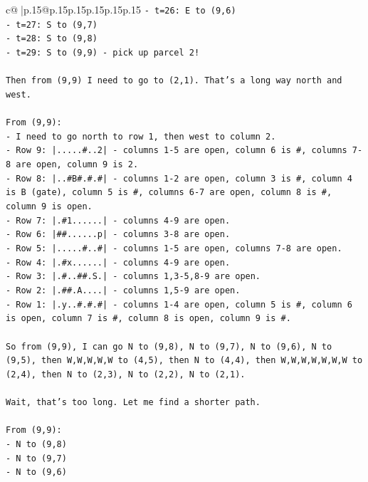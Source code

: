 \documentclass{article}
\begin{document}
{\begin{supertabular}{c@{$\;$}|p{.15\linewidth}@{}p{.15\linewidth}p{.15\linewidth}p{.15\linewidth}p{.15\linewidth}p{.15\linewidth}}
{{{\texttt{{-} t=26: E to (9,6)} \\
\texttt{{-} t=27: S to (9,7)} \\
\texttt{{-} t=28: S to (9,8)} \\
\texttt{{-} t=29: S to (9,9) {-} pick up parcel 2!} \\
\\ 
\texttt{Then from (9,9) I need to go to (2,1). That's a long way north and west.} \\
\\ 
\texttt{From (9,9):} \\
\texttt{{-} I need to go north to row 1, then west to column 2.} \\
\texttt{{-} Row 9: |.....\#..2| {-} columns 1{-}5 are open, column 6 is \#, columns 7{-}8 are open, column 9 is 2.} \\
\texttt{{-} Row 8: |..\#B\#.\#.\#| {-} columns 1{-}2 are open, column 3 is \#, column 4 is B (gate), column 5 is \#, columns 6{-}7 are open, column 8 is \#, column 9 is open.} \\
\texttt{{-} Row 7: |.\#1......| {-} columns 4{-}9 are open.} \\
\texttt{{-} Row 6: |\#\#......p| {-} columns 3{-}8 are open.} \\
\texttt{{-} Row 5: |.....\#..\#| {-} columns 1{-}5 are open, columns 7{-}8 are open.} \\
\texttt{{-} Row 4: |.\#x......| {-} columns 4{-}9 are open.} \\
\texttt{{-} Row 3: |.\#..\#\#.S.| {-} columns 1,3{-}5,8{-}9 are open.} \\
\texttt{{-} Row 2: |.\#\#.A....| {-} columns 1,5{-}9 are open.} \\
\texttt{{-} Row 1: |.y..\#.\#.\#| {-} columns 1{-}4 are open, column 5 is \#, column 6 is open, column 7 is \#, column 8 is open, column 9 is \#.} \\
\\ 
\texttt{So from (9,9), I can go N to (9,8), N to (9,7), N to (9,6), N to (9,5), then W,W,W,W,W to (4,5), then N to (4,4), then W,W,W,W,W,W,W to (2,4), then N to (2,3), N to (2,2), N to (2,1).} \\
\\ 
\texttt{Wait, that's too long. Let me find a shorter path.} \\
\\ 
\texttt{From (9,9):} \\
\texttt{{-} N to (9,8)} \\
\texttt{{-} N to (9,7)} \\
\texttt{{-} N to (9,6)} \\
}}}
\end{supertabular}}
\end{document}
